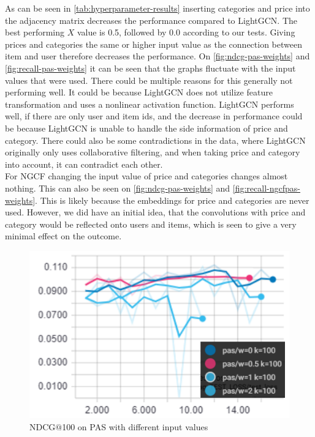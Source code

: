 As can be seen in \autoref{tab:hyperparameter-results} inserting categories and price into the adjacency matrix decreases the performance compared to LightGCN.
The best performing $X$ value is 0.5, followed by 0.0 according to our tests.
Giving prices and categories the same or higher input value as the connection between item and user therefore decreases the performance.
On \autoref{fig:ndcg-pas-weights} and \autoref{fig:recall-pas-weights} it can be seen that the graphs fluctuate with the input values that were used.
There could be multiple reasons for this generally not performing well.
It could be because LightGCN does not utilize feature transformation and uses a nonlinear activation function.
LightGCN performs well, if there are only user and item ids, and the decrease in performance could be because LightGCN is unable to handle the side information of price and category.
There could also be some contradictions in the data, where LightGCN originally only uses collaborative filtering, and when taking price and category into account, it can contradict each other.\\
For NGCF changing the input value of price and categories changes almost nothing.
This can also be seen on \autoref{fig:ndcg-pas-weights} and \autoref{fig:recall-ngcfpas-weights}.
This is likely because the embeddings for price and categories are never used.
However, we did have an initial idea, that the convolutions with price and category would be reflected onto users and items, which is seen to give a very minimal effect on the outcome.


\begin{figure}
    \includegraphics[width=\linewidth]{figures/graphs/ndcg-pas-weights.png}
    \caption{NDCG$@$100 on PAS with different input values}
    \label{fig:ndcg-pas-weights}
\end{figure}

